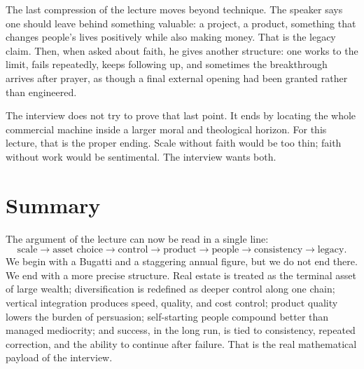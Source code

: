 The last compression of the lecture moves beyond technique. The speaker says one should leave behind something valuable: a project, a product, something that changes people's lives positively while also making money. That is the legacy claim. Then, when asked about faith, he gives another structure: one works to the limit, fails repeatedly, keeps following up, and sometimes the breakthrough arrives after prayer, as though a final external opening had been granted rather than engineered.

The interview does not try to prove that last point. It ends by locating the whole commercial machine inside a larger moral and theological horizon. For this lecture, that is the proper ending. Scale without faith would be too thin; faith without work would be sentimental. The interview wants both.

\section{Summary}

The argument of the lecture can now be read in a single line:
\begin{equation}
\text{scale} \to \text{asset choice} \to \text{control} \to \text{product} \to \text{people} \to \text{consistency} \to \text{legacy}.
\end{equation}
We begin with a Bugatti and a staggering annual figure, but we do not end there. We end with a more precise structure. Real estate is treated as the terminal asset of large wealth; diversification is redefined as deeper control along one chain; vertical integration produces speed, quality, and cost control; product quality lowers the burden of persuasion; self-starting people compound better than managed mediocrity; and success, in the long run, is tied to consistency, repeated correction, and the ability to continue after failure. That is the real mathematical payload of the interview.